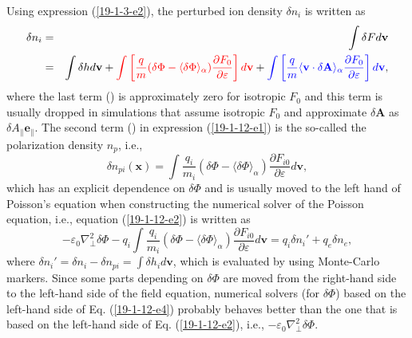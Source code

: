 \documentclass{article}
\newcommand{\tmcolor}[2]{{\color{#1}{#2}}}
\begin{document}
Using expression (\ref{19-1-3-e2}), the perturbed ion density $\delta n_i$ is
written as
\begin{eqnarray}
  \delta n_i & = & \int \delta F d\mathbf{v} \nonumber\\
  & = & \int \delta h d\mathbf{v}+ \tmcolor{red}{\int \left[ \frac{q}{m}
  (\delta \Phi - \langle \delta \Phi \rangle_{\alpha}) \frac{\partial
  F_0}{\partial \varepsilon} \right] d\mathbf{v}} + \tmcolor{blue}{\int \left[
  \frac{q}{m} \langle \mathbf{v} \cdot \delta \mathbf{A} \rangle_{\alpha}
  \frac{\partial F_0}{\partial \varepsilon} \right] d\mathbf{v}}, 
  \label{19-1-12-e1}
\end{eqnarray}
where the last term (\tmcolor{blue}{in blue}) is approximately zero for
isotropic $F_0$ and this term is usually dropped in simulations that assume
isotropic $F_0$ and approximate $\delta \mathbf{A}$ as $\delta A_{\parallel}
\mathbf{e}_{\parallel}$. The second term (\tmcolor{red}{in red}) in expression
(\ref{19-1-12-e1}) is the so-called the polarization density $n_p$, i.e.,
\begin{equation}
  \label{18-9-13-p9} \delta n_{p i} (\mathbf{x}) = \int \frac{q_i}{m_i}
  (\delta \Phi - \langle \delta \Phi \rangle_{\alpha}) \frac{\partial F_{i
  0}}{\partial \varepsilon} d\mathbf{v},
\end{equation}
which has an explicit dependence on $\delta \Phi$ and is usually moved to the
left hand of Poisson's equation when constructing the numerical solver of the
Poisson equation, i.e., equation (\ref{19-1-12-e2}) is written as
\begin{equation}
  \label{19-1-12-e4} - \varepsilon_0 \nabla^2_{\perp} \delta \Phi - q_i \int
  \frac{q_i}{m_i} (\delta \Phi - \langle \delta \Phi \rangle_{\alpha})
  \frac{\partial F_{i 0}}{\partial \varepsilon} d\mathbf{v}= q_i \delta n_i' +
  q_e \delta n_e,
\end{equation}
where $\delta n_i' = \delta n_i - \delta n_{p i} = \int \delta h_i
d\mathbf{v}$, which is evaluated by using Monte-Carlo markers. Since some
parts depending on $\delta \Phi$ are moved from the right-hand side to the
left-hand side of the field equation, numerical solvers (for $\delta \Phi$)
based on the left-hand side of Eq. (\ref{19-1-12-e4}) probably behaves better
than the one that is based on the left-hand side of Eq. (\ref{19-1-12-e2}),
i.e., $- \varepsilon_0 \nabla^2_{\perp} \delta \Phi$.

\
\end{document}
